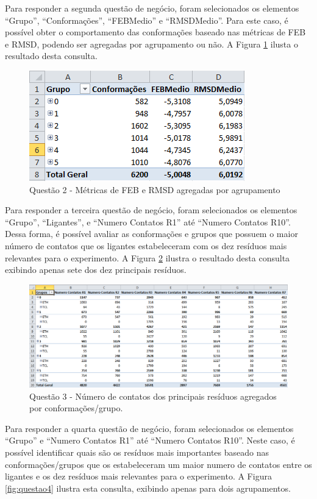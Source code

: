 {Para responder a segunda questão de negócio, foram selecionados os elementos ``Grupo'', ``Conformações'', ``FEBMedio'' e ``RMSDMedio''. Para este caso, é possível obter o comportamento das conformações baseado nas métricas de FEB e RMSD, podendo ser agregadas por agrupamento ou não. A Figura \ref{fig:questao2} ilusta o resultado desta consulta.

\begin{figure}[h]
        \center
        \includegraphics[scale=0.8]{images/Questao2.PNG}
        \caption{Questão 2 - Métricas de FEB e RMSD agregadas por agrupamento}
        \label{fig:questao2}
\end{figure}

Para responder a terceira questão de negócio, foram selecionados os elementos ``Grupo'', ``Ligantes'', e ``Numero Contatos R1'' até ``Numero Contatos R10''. Dessa forma, é possível avaliar as conformações e grupos que possuem o maior número de contatos que os ligantes estabeleceram com os dez resíduos mais relevantes para o experimento. A Figura \ref{fig:questao3} ilustra o resultado desta consulta exibindo apenas sete dos dez principais resíduos.

\begin{figure}[h]
        \center
        \includegraphics[scale=0.62]{images/Questao3.PNG}
        \caption{Questão 3 - Número de contatos dos principais resíduos agregados por conformações/grupo.}
        \label{fig:questao3}
\end{figure}

Para responder a quarta questão de negócio, foram selecionados os elementos ``Grupo'' e ``Numero Contatos R1'' até ``Numero Contatos R10''. Neste caso, é possível identificar quais são os resíduos mais importantes baseado nas conformações/grupos que os estabeleceram um maior numero de contatos entre os ligantes e os dez resíduos mais relevantes para o experimento. A Figura \ref{fig:questao4} ilustra esta consulta, exibindo apenas para dois agrupamentos. 

}
